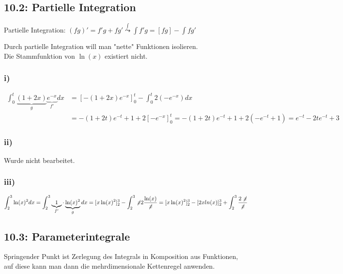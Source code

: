 \documentclass[
    accentcolor=pink,
    boxarc,
    dark_mode,
    logofile=enmpty
]{rubos-tuda-template}
\begin{document}
    \subsection*{10.2: Partielle Integration}
    Partielle Integration: $\displaystyle{(fg)'=f'g+fg'} \overset{\int}{\leadsto} \int f'g=[fg]-\int fg'$
    \begin{anmerkungen}
        Durch partielle Integration will man "nette" Funktionen isolieren.\\
        Die Stammfunktion von $\ln(x)$ existiert nicht.
    \end{anmerkungen}

    \subsubsection*{i)}
    \begin{align*}
        \int_{0}^{t}\underbrace{(1+2x)}_g\underbrace{e^{-x}}_{f'}dx & =[-(1+2x)e^{-x}]_0^t-\int_{0}^{t}2(-e^{-x})dx                                  \\
                                                                    & =-(1+2t)e^{-t}+1+2[-e^{-x}]_0^t=-(1+2t)e^{-t}+1+2(-e^{-t}+1)=e^{-t}-2te^{-t}+3
    \end{align*}

    \subsubsection*{ii)}
    \begin{anmerkung}
        Wurde nicht bearbeitet.
    \end{anmerkung}

    \subsubsection*{iii)}
    \[\int_{2}^{3}\ln(x)^2dx= \int_{2}^{3}\underbrace{1}_{f'}\cdot\underbrace{\ln(x)^2}_gdx=[x\ln(x)^2]_2^3-\int_{2}^{3}\not\!x2\frac{\ln(x)}{\not\!x}=[x\ln(x)^2]_2^3-[2xln(x)]_2^3+\int_{2}^{3}\frac{2\not\!x}{\not\!x}\]

    \subsection*{10.3: Parameterintegrale}
    \begin{anmerkungen}
        Springender Punkt ist Zerlegung des Integrals in Komposition aus Funktionen, auf diese kann man dann die mehrdimensionale Kettenregel anwenden.
    \end{anmerkungen}
\end{document}
